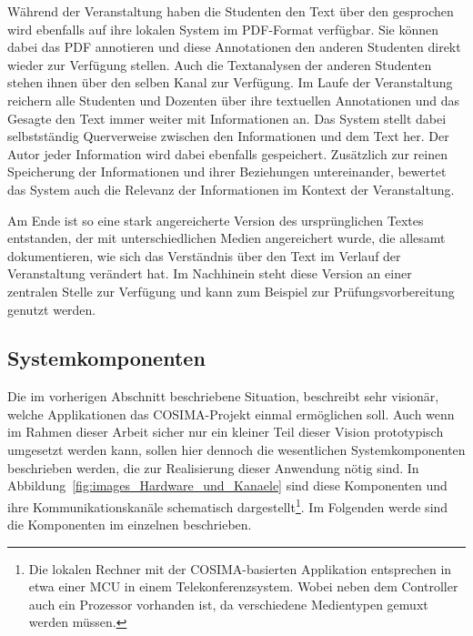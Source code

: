 \begin{framed}
  Während der Veranstaltung haben die Studenten den Text über den gesprochen wird ebenfalls auf ihre lokalen System im PDF-Format verfügbar. Sie können dabei das PDF annotieren und diese Annotationen den anderen Studenten direkt wieder zur Verfügung stellen. Auch die Textanalysen der anderen Studenten stehen ihnen über den selben Kanal zur Verfügung. Im Laufe der Veranstaltung reichern alle Studenten und Dozenten über ihre textuellen Annotationen und das Gesagte den Text immer weiter mit Informationen an. Das System stellt dabei selbstständig Querverweise zwischen den Informationen und dem Text her. Der Autor jeder Information wird dabei ebenfalls gespeichert. Zusätzlich zur reinen Speicherung der Informationen und ihrer Beziehungen untereinander, bewertet das System auch die Relevanz der Informationen im Kontext der Veranstaltung.

  Am Ende ist so eine stark angereicherte Version des ursprünglichen Textes entstanden, der mit unterschiedlichen Medien angereichert wurde, die allesamt dokumentieren, wie sich das Verständnis über den Text im Verlauf der Veranstaltung verändert hat. Im Nachhinein steht diese Version an einer zentralen Stelle zur Verfügung und kann zum Beispiel zur Prüfungsvorbereitung genutzt werden.

\end{framed}


\subsection{Systemkomponenten} %
\label{sub:systemkomponenten}

  Die im vorherigen Abschnitt beschriebene Situation, beschreibt sehr visionär, welche Applikationen das COSIMA-Projekt einmal ermöglichen soll. Auch wenn im Rahmen dieser Arbeit sicher nur ein kleiner Teil dieser Vision prototypisch umgesetzt werden kann, sollen hier dennoch die wesentlichen Systemkomponenten beschrieben werden, die zur Realisierung dieser Anwendung nötig sind. In Abbildung~\ref{fig:images_Hardware_und_Kanaele} sind diese Komponenten und ihre Kommunikationskanäle schematisch dargestellt\footnote{Die lokalen Rechner mit der COSIMA-basierten Applikation entsprechen in etwa einer MCU in einem Telekonferenzsystem. Wobei neben dem Controller auch ein Prozessor vorhanden ist, da verschiedene Medientypen gemuxt werden müssen.\citep[S. 224]{schwabe2001ckl}}. Im Folgenden werde sind die Komponenten im einzelnen beschrieben.

